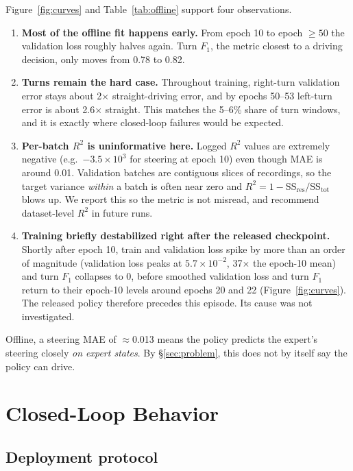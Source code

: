 \documentclass[11pt]{article}
\begin{document}
Figure~\ref{fig:curves} and Table~\ref{tab:offline} support four observations.
\begin{enumerate}
  \item \textbf{Most of the offline fit happens early.} From epoch 10 to epoch $\geq 50$ the validation loss roughly halves again. Turn $F_1$, the metric closest to a driving decision, only moves from 0.78 to 0.82.
  \item \textbf{Turns remain the hard case.} Throughout training, right-turn validation error stays about 2$\times$ straight-driving error, and by epochs 50--53 left-turn error is about 2.6$\times$ straight. This matches the 5--6\% share of turn windows, and it is exactly where closed-loop failures would be expected.
  \item \textbf{Per-batch $R^2$ is uninformative here.} Logged $R^2$ values are extremely negative (e.g.\ $-3.5\times10^{3}$ for steering at epoch 10) even though MAE is around 0.01. Validation batches are contiguous slices of recordings, so the target variance \emph{within} a batch is often near zero and $R^2 = 1 - \mathrm{SS}_{\text{res}}/\mathrm{SS}_{\text{tot}}$ blows up. We report this so the metric is not misread, and recommend dataset-level $R^2$ in future runs.
  \item \textbf{Training briefly destabilized right after the released checkpoint.} Shortly after epoch 10, train and validation loss spike by more than an order of magnitude (validation loss peaks at $5.7\times10^{-2}$, 37$\times$ the epoch-10 mean) and turn $F_1$ collapses to 0, before smoothed validation loss and turn $F_1$ return to their epoch-10 levels around epochs 20 and 22 (Figure~\ref{fig:curves}). The released policy therefore precedes this episode. Its cause was not investigated.
\end{enumerate}

Offline, a steering MAE of $\approx$0.013 means the policy predicts the expert's steering closely \emph{on expert states}. By \S\ref{sec:problem}, this does not by itself say the policy can drive.

\section{Closed-Loop Behavior}
\label{sec:closedloop}

\subsection{Deployment protocol}
\end{document}
